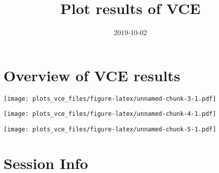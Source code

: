 \documentclass[]{article}
\title{Plot results of VCE}
\author{}
\date{2019-10-02}
\begin{document}
\maketitle

\section{Overview of VCE results}\label{overview-of-vce-results}

\texttt{[image: plots\_vce\_files/figure-latex/unnamed-chunk-3-1.pdf]}

\texttt{[image: plots\_vce\_files/figure-latex/unnamed-chunk-4-1.pdf]}

\texttt{[image: plots\_vce\_files/figure-latex/unnamed-chunk-5-1.pdf]}

\section{Session Info}\label{session-info}
\end{document}

